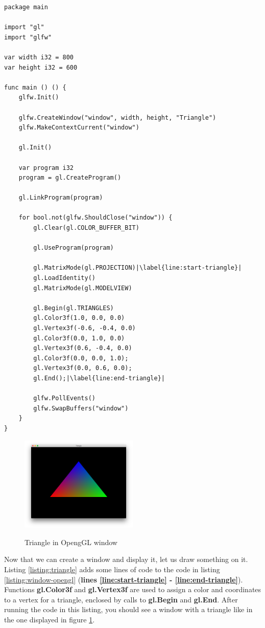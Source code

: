 \documentclass[11pt,fleqn,openany]{book} %
\begin{document}
\begin{lstlisting}[caption={Drawing a triangle to a window},captionpos=b,label={listing:triangle}]
package main

import "gl"
import "glfw"

var width i32 = 800
var height i32 = 600

func main () () {
	glfw.Init()

	glfw.CreateWindow("window", width, height, "Triangle")
	glfw.MakeContextCurrent("window")
	
	gl.Init()
	
	var program i32
	program = gl.CreateProgram()
	
	gl.LinkProgram(program)

	for bool.not(glfw.ShouldClose("window")) {
		gl.Clear(gl.COLOR_BUFFER_BIT)

		gl.UseProgram(program)
		
		gl.MatrixMode(gl.PROJECTION)|\label{line:start-triangle}|
		gl.LoadIdentity()
		gl.MatrixMode(gl.MODELVIEW)

		gl.Begin(gl.TRIANGLES)
		gl.Color3f(1.0, 0.0, 0.0)
		gl.Vertex3f(-0.6, -0.4, 0.0)
		gl.Color3f(0.0, 1.0, 0.0)
		gl.Vertex3f(0.6, -0.4, 0.0)
		gl.Color3f(0.0, 0.0, 1.0);
		gl.Vertex3f(0.0, 0.6, 0.0);
		gl.End();|\label{line:end-triangle}|
		
		glfw.PollEvents()
		glfw.SwapBuffers("window")
	}
}
\end{lstlisting}

\begin{figure}
\caption{Triangle in OpengGL window}
\centering
\includegraphics[width=0.5\textwidth]{img/opengl-triangle.png}
\label{figure:triangle}
\end{figure}

Now that we can create a window and display it, let us draw something on it. Listing \ref{listing:triangle} adds some lines of code to the code in listing \ref{listing:window-opengl} (\textbf{lines \ref{line:start-triangle} - \ref{line:end-triangle}}). Functions \textbf{gl.Color3f} and \textbf{gl.Vertex3f} are used to assign a color and coordinates to a vertex for a triangle, enclosed by calls to \textbf{gl.Begin} and \textbf{gl.End}. After running the code in this listing, you should see a window with a triangle like in the one displayed in figure \ref{figure:triangle}.
\end{document}
